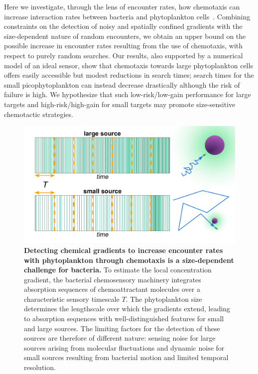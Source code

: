 \documentclass[9pt,twocolumn,twoside]{pnas-new}
\begin{document}
Here we investigate, through the lens of encounter rates, how chemotaxis can increase interaction rates between bacteria and phytoplankton cells~\cite{slomka2023encounter}. Combining constraints on the detection of noisy and spatially confined gradients with the size-dependent nature of random encounters, we obtain an upper bound on the possible increase in encounter rates resulting from the use of chemotaxis, with respect to purely random searches. Our results, also supported by a numerical model of an ideal sensor, show that chemotaxis towards large phytoplankton cells offers easily accessible but modest reductions in search times; search times for the small picophytoplankton can instead decrease drastically although the risk of failure is high. We hypothesize that such low-risk/low-gain performance for large targets and high-risk/high-gain for small targets may promote size-sensitive chemotactic strategies.


\begin{figure}
    \centering
    \includegraphics[width=17.8cm]{fig1_new.pdf}
    \caption{
        \textbf{
        Detecting chemical gradients to increase encounter rates with phytoplankton through chemotaxis is a size-dependent challenge for bacteria.
        }
        To estimate the local concentration gradient, the bacterial chemosensory machinery integrates absorption sequences of chemoattractant molecules over a characteristic sensory timescale $T$.
        The phytoplankton size determines the lengthscale over which the gradients extend, leading to absorption sequences with well-distinguished features for small and large sources.
        The limiting factors for the detection of these sources are therefore of different nature: sensing noise for large sources arising from molecular fluctuations and dynamic noise for small sources resulting from bacterial motion and limited temporal resolution.
    }
    \label{fig:setup}
\end{figure}
\end{document}
